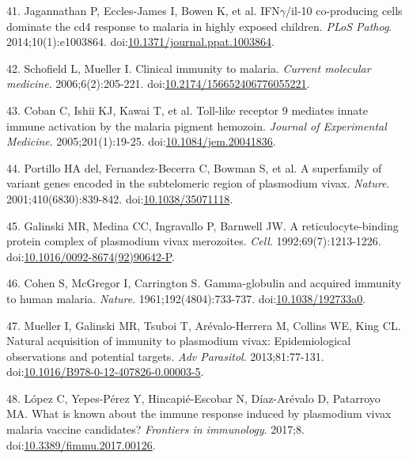 \documentclass[]{article}
\begin{document}
\hypertarget{ref-jagannathan2014}{}
41. Jagannathan P, Eccles-James I, Bowen K, et al. IFN\(\gamma\)/il-10
co-producing cells dominate the cd4 response to malaria in highly
exposed children. \emph{PLoS Pathog}. 2014;10(1):e1003864.
doi:\href{https://doi.org/10.1371/journal.ppat.1003864}{10.1371/journal.ppat.1003864}.

\hypertarget{ref-schofield2006toll}{}
42. Schofield L, Mueller I. Clinical immunity to malaria. \emph{Current
molecular medicine}. 2006;6(2):205-221.
doi:\href{https://doi.org/10.2174/156652406776055221}{10.2174/156652406776055221}.

\hypertarget{ref-coban2005toll}{}
43. Coban C, Ishii KJ, Kawai T, et al. Toll-like receptor 9 mediates
innate immune activation by the malaria pigment hemozoin. \emph{Journal
of Experimental Medicine}. 2005;201(1):19-25.
doi:\href{https://doi.org/10.1084/jem.20041836}{10.1084/jem.20041836}.

\hypertarget{ref-portillo2001vir}{}
44. Portillo HA del, Fernandez-Becerra C, Bowman S, et al. A superfamily
of variant genes encoded in the subtelomeric region of plasmodium vivax.
\emph{Nature}. 2001;410(6830):839-842.
doi:\href{https://doi.org/10.1038/35071118}{10.1038/35071118}.

\hypertarget{ref-galinski1992rbp}{}
45. Galinski MR, Medina CC, Ingravallo P, Barnwell JW. A
reticulocyte-binding protein complex of plasmodium vivax merozoites.
\emph{Cell}. 1992;69(7):1213-1226.
doi:\href{https://doi.org/10.1016/0092-8674(92)90642-P}{10.1016/0092-8674(92)90642-P}.

\hypertarget{ref-cohen1961}{}
46. Cohen S, McGregor I, Carrington S. Gamma-globulin and acquired
immunity to human malaria. \emph{Nature}. 1961;192(4804):733-737.
doi:\href{https://doi.org/10.1038/192733a0}{10.1038/192733a0}.

\hypertarget{ref-mueller2013}{}
47. Mueller I, Galinski MR, Tsuboi T, Arévalo-Herrera M, Collins WE,
King CL. Natural acquisition of immunity to plasmodium vivax:
Epidemiological observations and potential targets. \emph{Adv
Parasitol}. 2013;81:77-131.
doi:\href{https://doi.org/10.1016/B978-0-12-407826-0.00003-5}{10.1016/B978-0-12-407826-0.00003-5}.

\hypertarget{ref-lopez2017}{}
48. López C, Yepes-Pérez Y, Hincapié-Escobar N, Díaz-Arévalo D,
Patarroyo MA. What is known about the immune response induced by
plasmodium vivax malaria vaccine candidates? \emph{Frontiers in
immunology}. 2017;8.
doi:\href{https://doi.org/10.3389/fimmu.2017.00126}{10.3389/fimmu.2017.00126}.
\end{document}
